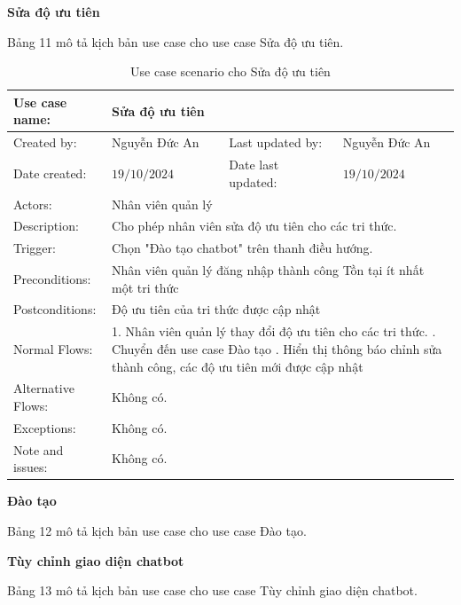 \textbf{Sửa độ ưu tiên}

Bảng 11 mô tả kịch bản use case cho use case Sửa độ ưu tiên.
\begin{table}[H]
	\centering
	\begin{tabular}{|l|l|l|l|} 
		\hline Use case name: & \multicolumn{3}{|l|}{Sửa độ ưu tiên} \\ 
		\hline Created by: & Nguyễn Đức An & Last updated by: & Nguyễn Đức An \\ 
		\hline Date created: & $19 / 10 / 2024$ & Date last updated: & $19 / 10 / 2024$\\ 
		\hline Actors: & \multicolumn{3}{|l|}{ Nhân viên quản lý } \\ 
		\hline Description: & \multicolumn{3}{|p{12cm}|}{ Cho phép nhân viên sửa độ ưu tiên cho các tri thức. } \\ 
		\hline Trigger: & \multicolumn{3}{|p{12cm}|}{ Chọn "Đào tạo chatbot" trên thanh điều hướng. } \\ 
		\hline Preconditions: & \multicolumn{3}{|p{12cm}|}{ 
			Nhân viên quản lý đăng nhập thành công \newline
            Tồn tại ít nhất một tri thức
		} \\ 
		\hline Postconditions: & \multicolumn{3}{|p{12cm}|}{ 
			Độ ưu tiên của tri thức được cập nhật
		} \\ 
		\hline Normal Flows: & \multicolumn{3}{|p{12cm}|}{ 
			1. Nhân viên quản lý thay đổi độ ưu tiên cho các tri thức. \newline 
			2. Chuyển đến use case Đào tạo \newline
            3. Hiển thị thông báo chỉnh sửa thành công, các độ ưu tiên mới được cập nhật
		} \\ 
		\hline Alternative Flows: & \multicolumn{3}{|p{12cm}|}{ Không có. } \\ 
		\hline Exceptions: & \multicolumn{3}{|p{12cm}|}{ Không có. } \\ 
		\hline Note and issues: & \multicolumn{3}{|p{12cm}|}{ Không có. } \\ 
		\hline
	\end{tabular}
	\caption{Use case scenario cho Sửa độ ưu tiên}
\end{table}
\textbf{Đào tạo}

Bảng 12 mô tả kịch bản use case cho use case Đào tạo.

\textbf{Tùy chỉnh giao diện chatbot}

Bảng 13 mô tả kịch bản use case cho use case Tùy chỉnh giao diện chatbot.

